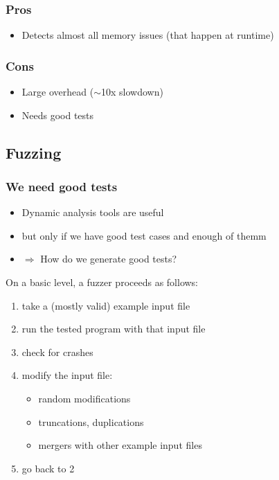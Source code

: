 \documentclass[12pt]{article}
\begin{document}
\subsubsection{Pros}
\begin{itemize}
\item Detects almost all memory issues (that happen at runtime)
\end{itemize}

\subsubsection{Cons}
\begin{itemize}
\item Large overhead ($\sim$10x slowdown)
\item Needs good tests
\end{itemize}

\subsection{Fuzzing}

\subsubsection{We need good tests}

\begin{itemize}
    \item Dynamic analysis tools are useful 
    \item but only if we have good test cases and enough of themm
    \item $\Rightarrow$ How do we generate good tests?
\end{itemize}

On a basic level, a fuzzer proceeds as follows:

\begin{enumerate}
    \item take a (mostly valid) example input file
    \item run the tested program with that input file
    \item check for crashes
    \item modify the input file:
    \begin{itemize}
        \item random modifications
        \item truncations, duplications
        \item mergers with other example input files
    \end{itemize}
    \item go back to 2
\end{enumerate}
\end{document}
